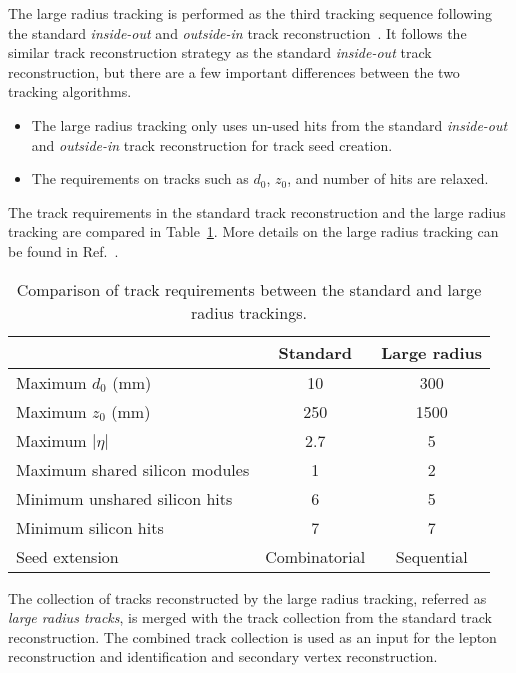 The large radius tracking is performed as the third tracking sequence following the standard \textit{inside-out} and \textit{outside-in} track reconstruction~\cite{Cornelissen:1020106}. It follows the similar track reconstruction strategy as the standard \textit{inside-out} track reconstruction, but there are a few important differences between the two tracking algorithms.

\begin{itemize}
	\item The large radius tracking only uses un-used hits from the standard \textit{inside-out} and \textit{outside-in} track reconstruction for track seed creation.
	\item The requirements on tracks such as $d_{0}$, $z_{0}$, and number of hits are relaxed.
\end{itemize}

The track requirements in the standard track reconstruction and the large radius tracking are compared in Table~\ref{table:lrt_comparison}. More details on the large radius tracking can be found in Ref.~\cite{Che:2255680}.

\begin{table}[!htb]
  \centering
  \begin{tabular}{ l  c  c } 
    \hline
    \hline
    & Standard & Large radius \\ [0.5ex] 
    \hline
    Maximum $d_{0}$ (mm) & 10 & 300 \\ 
    Maximum $z_{0}$ (mm) & 250 & 1500 \\
    Maximum $|\eta|$ & 2.7 & 5 \\
    Maximum shared silicon modules & 1 & 2 \\
    Minimum unshared silicon hits& 6 & 5 \\
    Minimum silicon hits & 7 & 7\\
    Seed extension & Combinatorial & Sequential \\
    \hline
    \hline
  \end{tabular}
  \caption{Comparison of track requirements between the standard and large radius trackings.}
  \label{table:lrt_comparison}
\end{table}

The collection of tracks reconstructed by the large radius tracking, referred as \textit{large radius tracks}, is merged with the track collection from the standard track reconstruction. The combined track collection is used as an input for the lepton reconstruction and identification and secondary vertex reconstruction.

